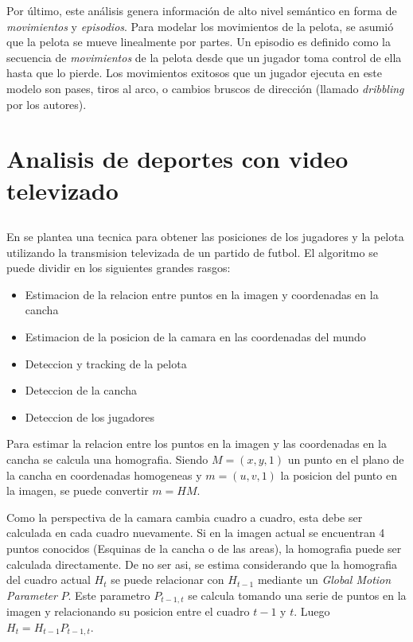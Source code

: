 \documentclass[a4paper,10pt]{article}
\begin{document}
Por último, este análisis genera información de alto nivel semántico en forma de \textit{movimientos}
y \textit{episodios}. Para modelar los movimientos de la pelota, se asumió que la pelota se mueve linealmente por partes.
Un episodio es definido como la secuencia de \textit{movimientos} de la pelota desde que un jugador toma control
de ella hasta que lo pierde. Los movimientos exitosos que un jugador ejecuta en este modelo son pases, tiros al arco,
o cambios bruscos de dirección (llamado \textit{dribbling} por los autores).

\section{Analisis de deportes con video televizado}

\subsection{}

En \cite{LIU20061146} se plantea una tecnica para obtener las posiciones de los jugadores y la pelota utilizando la transmision televizada de un partido de futbol.
El algoritmo se puede dividir en los siguientes grandes rasgos:
\begin{itemize}
\item Estimacion de la relacion entre puntos en la imagen y coordenadas en la cancha
\item Estimacion de la posicion de la camara en las coordenadas del mundo
\item Deteccion y tracking de la pelota
\item Deteccion de la cancha
\item Deteccion de los jugadores
\end{itemize}

Para estimar la relacion entre los puntos en la imagen y las coordenadas en la cancha se calcula una homografia.
Siendo $M = (x, y, 1)$ un punto en el plano de la cancha en coordenadas homogeneas y $m = (u, v, 1)$ la posicion del punto en la imagen, se puede convertir $ m = H M $.

Como la perspectiva de la camara cambia cuadro a cuadro, esta debe ser calculada en cada cuadro nuevamente.
Si en la imagen actual se encuentran 4 puntos conocidos (Esquinas de la cancha o de las areas), la homografia puede ser calculada directamente.
De no ser asi, se estima considerando que la homografia del cuadro actual $H_t$ se puede relacionar con $H_{t-1}$ mediante un \textit{Global Motion Parameter} $P$.
Este parametro $P_{t-1,t}$ se calcula tomando una serie de puntos en la imagen y relacionando su posicion entre el cuadro $t-1$ y $t$.
Luego $ H_t = H_{t-1} P_{t-1,t}$.
\end{document}
